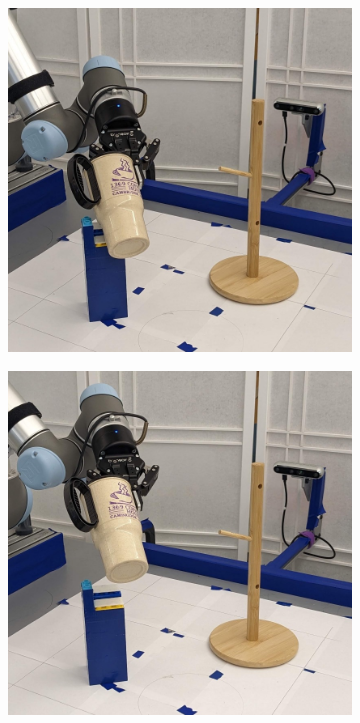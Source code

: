 \documentclass{article}
\begin{document}
\begin{figure}[]
\begin{subfigure}{(\linewidth - 0.05\linewidth)/5}
    \end{subfigure}
    \begin{subfigure}{(\linewidth - 0.05\linewidth)/5}
        \centering
        \includegraphics[width=\linewidth]{figures/episodes/mug_on_tree_zoom/5.jpg}
    \end{subfigure}
    \begin{subfigure}{(\linewidth - 0.05\linewidth)/5}
        \centering
        \includegraphics[width=\linewidth]{figures/episodes/mug_on_tree_zoom/6.jpg}

\end{subfigure}
\end{figure}
\end{document}
